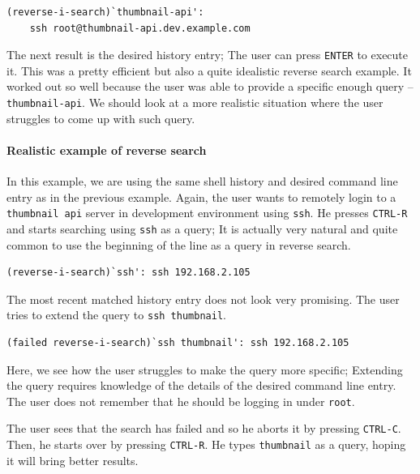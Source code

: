 \begin{verbatim}
(reverse-i-search)`thumbnail-api':
    ssh root@thumbnail-api.dev.example.com
\end{verbatim}

The next result is the desired history entry; The user can press \verb|ENTER| to execute it. This was a pretty efficient but also a quite idealistic reverse search example. It worked out so well because the user was able to provide a specific enough query -- \verb|thumbnail-api|. We should look at a more realistic situation where the user struggles to come up with such query. %
\paragraph{Realistic example of reverse search}

In this example, we are using the same shell history and desired command line entry as in the previous example. Again, the user wants to remotely login to a \verb|thumbnail api| server in development environment using \verb|ssh|. He presses \verb|CTRL-R| and starts searching using \verb|ssh| as a query; It is actually very natural and quite common to use the beginning of the line as a query in reverse search.

\begin{verbatim}
(reverse-i-search)`ssh': ssh 192.168.2.105
\end{verbatim}

The most recent matched history entry does not look very promising. The user tries to extend the query to \verb|ssh thumbnail|.

\begin{verbatim}
(failed reverse-i-search)`ssh thumbnail': ssh 192.168.2.105
\end{verbatim}

Here, we see how the user struggles to make the query more specific; Extending the query requires knowledge of the details of the desired command line entry. The user does not remember that he should be logging in under \verb|root|.  %

The user sees that the search has failed and so he aborts it by pressing \verb|CTRL-C|. Then, he starts over by pressing \verb|CTRL-R|. He types \verb|thumbnail| as a query, hoping it will bring better results.

